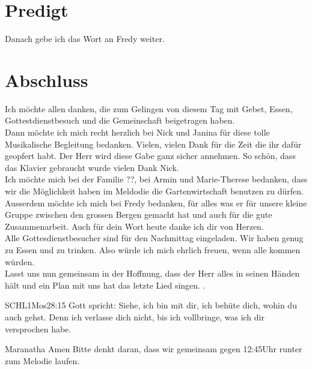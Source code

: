 \documentclass{../../inc/mybib}
\begin{document}
\section{Predigt}

Danach gebe ich das Wort an Fredy weiter.








\section{Abschluss}

Ich möchte allen danken, die zum Gelingen von diesem Tag mit Gebet, Essen, Gottestdienstbesuch und die Gemeinschaft beigetragen haben.\\
Dann möchte ich mich recht herzlich bei Nick und Janina für diese tolle Musikalische Begleitung bedanken. Vielen, vielen Dank für die Zeit die ihr dafür geopfert habt. Der Herr wird diese Gabe ganz sicher annehmen. So schön, dass das Klavier gebraucht wurde vielen Dank Nick.\\
Ich möchte mich bei der Familie ??, bei Armin und Marie-Therese bedanken, dass wir die Möglichkeit haben im Meldodie die Gartenwirtschaft benutzen zu dürfen.\\
Ausserdem möchte ich mich bei Fredy bedanken, für alles was er für unsere kleine Gruppe zwischen den grossen Bergen gemacht hat und auch für die gute Zusammenarbeit. Auch für dein Wort heute danke ich dir von Herzen.\\
Alle Gottesdienstbesucher sind für den Nachmittag eingeladen. Wir haben genug zu Essen und zu trinken. Also würde ich mich ehrlich freuen, wenn alle kommen würden.\\
Lasst uns nun gemeinsam in der Hoffnung, dass der Herr alles in seinen Händen hält und ein Plan mit uns hat das letzte Lied singen. .

\beten{}

\begin{bibelbox}{SCHL}{1Mos}{28:15}
    Gott spricht: Siehe, ich bin mit dir,
    ich behüte dich, wohin du auch gehst.
    Denn ich verlasse dich nicht,
    bis ich vollbringe, was ich dir versprochen habe.
\end{bibelbox}

Maranatha Amen
Bitte denkt daran, dass wir gemeinsam gegen 12:45Uhr runter zum Melodie laufen. 
\end{document}
